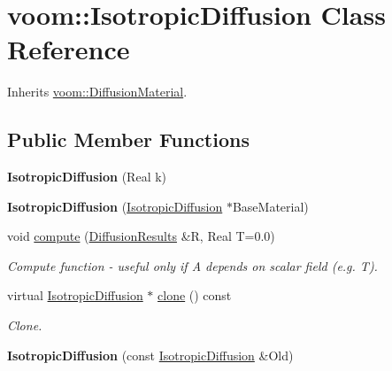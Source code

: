 \hypertarget{classvoom_1_1_isotropic_diffusion}{
\section{voom::IsotropicDiffusion Class Reference}
\label{classvoom_1_1_isotropic_diffusion}
}


Inherits \hyperlink{classvoom_1_1_diffusion_material}{voom::DiffusionMaterial}.\subsection*{Public Member Functions}
\begin{DoxyCompactItemize}
\item 
\hypertarget{classvoom_1_1_isotropic_diffusion_ad79ad7692009081a520d53a3d17b0021}{
{\bfseries IsotropicDiffusion} (Real k)}
\label{classvoom_1_1_isotropic_diffusion_ad79ad7692009081a520d53a3d17b0021}

\item 
\hypertarget{classvoom_1_1_isotropic_diffusion_a3747c916943bcea3fe35e3351d25d10a}{
{\bfseries IsotropicDiffusion} (\hyperlink{classvoom_1_1_isotropic_diffusion}{IsotropicDiffusion} $\ast$BaseMaterial)}
\label{classvoom_1_1_isotropic_diffusion_a3747c916943bcea3fe35e3351d25d10a}

\item 
\hypertarget{classvoom_1_1_isotropic_diffusion_a0f22f8c9ba5460c6f2912d555616534d}{
void \hyperlink{classvoom_1_1_isotropic_diffusion_a0f22f8c9ba5460c6f2912d555616534d}{compute} (\hyperlink{structvoom_1_1_diffusion_material_1_1_diffusion_results}{DiffusionResults} \&R, Real T=0.0)}
\label{classvoom_1_1_isotropic_diffusion_a0f22f8c9ba5460c6f2912d555616534d}

\begin{DoxyCompactList}\small\item\em Compute function -\/ useful only if A depends on scalar field (e.g. T). \item\end{DoxyCompactList}\item 
\hypertarget{classvoom_1_1_isotropic_diffusion_ae744786c1b71137fd189d7fa1516f34c}{
virtual \hyperlink{classvoom_1_1_isotropic_diffusion}{IsotropicDiffusion} $\ast$ \hyperlink{classvoom_1_1_isotropic_diffusion_ae744786c1b71137fd189d7fa1516f34c}{clone} () const }
\label{classvoom_1_1_isotropic_diffusion_ae744786c1b71137fd189d7fa1516f34c}

\begin{DoxyCompactList}\small\item\em Clone. \item\end{DoxyCompactList}\item 
\hypertarget{classvoom_1_1_isotropic_diffusion_ac349d7a823b1a5608b68d8386a934fce}{
{\bfseries IsotropicDiffusion} (const \hyperlink{classvoom_1_1_isotropic_diffusion}{IsotropicDiffusion} \&Old)}
\label{classvoom_1_1_isotropic_diffusion_ac349d7a823b1a5608b68d8386a934fce}


\end{DoxyCompactItemize}

